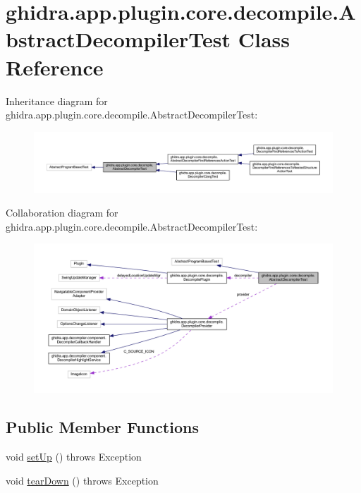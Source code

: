 \hypertarget{classghidra_1_1app_1_1plugin_1_1core_1_1decompile_1_1_abstract_decompiler_test}{}\section{ghidra.\+app.\+plugin.\+core.\+decompile.\+Abstract\+Decompiler\+Test Class Reference}
\label{classghidra_1_1app_1_1plugin_1_1core_1_1decompile_1_1_abstract_decompiler_test}


Inheritance diagram for ghidra.\+app.\+plugin.\+core.\+decompile.\+Abstract\+Decompiler\+Test\+:
\nopagebreak
\begin{figure}[H]
\begin{center}
\leavevmode
\includegraphics[width=350pt]{classghidra_1_1app_1_1plugin_1_1core_1_1decompile_1_1_abstract_decompiler_test__inherit__graph}
\end{center}
\end{figure}


Collaboration diagram for ghidra.\+app.\+plugin.\+core.\+decompile.\+Abstract\+Decompiler\+Test\+:
\nopagebreak
\begin{figure}[H]
\begin{center}
\leavevmode
\includegraphics[width=350pt]{classghidra_1_1app_1_1plugin_1_1core_1_1decompile_1_1_abstract_decompiler_test__coll__graph}
\end{center}
\end{figure}
\subsection*{Public Member Functions}
\begin{DoxyCompactItemize}
\item 
void \mbox{\hyperlink{classghidra_1_1app_1_1plugin_1_1core_1_1decompile_1_1_abstract_decompiler_test_a2954516a95013451596f225b6fca7977}{set\+Up}} ()  throws Exception 
\item 
void \mbox{\hyperlink{classghidra_1_1app_1_1plugin_1_1core_1_1decompile_1_1_abstract_decompiler_test_a153b27b741384bae8302270617332af7}{tear\+Down}} ()  throws Exception 
\end{DoxyCompactItemize}
